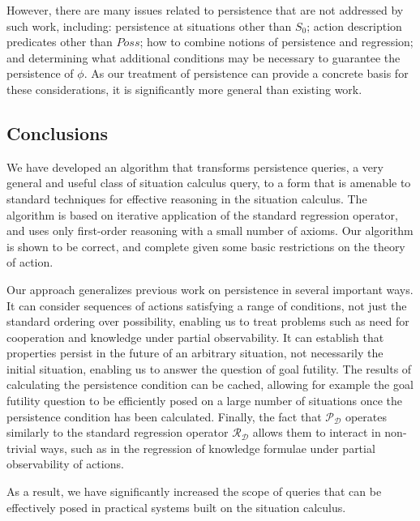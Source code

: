However, there are many issues related to persistence that are not
addressed by such work, including: persistence at situations other
than $S_{0}$; action description predicates other than $Poss$; how
to combine notions of persistence and regression; and determining
what additional conditions may be necessary to guarantee the persistence
of $\phi$. As our treatment of persistence can provide a concrete
basis for these considerations, it is significantly more general than
existing work.


\subsection{Conclusions}

We have developed an algorithm that transforms persistence queries,
a very general and useful class of situation calculus query, to a
form that is amenable to standard techniques for effective reasoning
in the situation calculus. The algorithm is based on iterative application
of the standard regression operator, and uses only first-order reasoning
with a small number of axioms. Our algorithm is shown to be correct,
and complete given some basic restrictions on the theory of action.

Our approach generalizes previous work on persistence in several important
ways. It can consider sequences of actions satisfying a range of conditions,
not just the standard ordering over possibility, enabling us to treat
problems such as need for cooperation and knowledge under partial
observability. It can establish that properties persist in the future
of an arbitrary situation, not necessarily the initial situation,
enabling us to answer the question of goal futility. The results of
calculating the persistence condition can be cached, allowing for
example the goal futility question to be efficiently posed on a large
number of situations once the persistence condition has been calculated.
Finally, the fact that $\mathcal{P_{D}}$ operates similarly to the
standard regression operator $\mathcal{R}_{\mathcal{D}}$ allows them
to interact in non-trivial ways, such as in the regression of knowledge
formulae under partial observability of actions.

As a result, we have significantly increased the scope of queries
that can be effectively posed in practical systems built on the situation
calculus.

